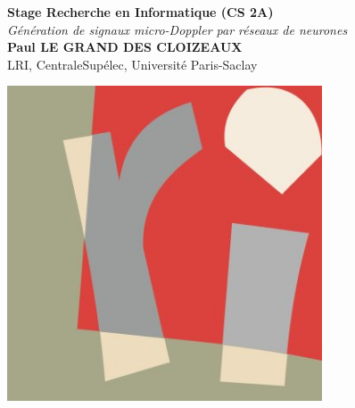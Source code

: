 \documentclass[a0,portrait]{a0poster}
\begin{document}
\large
\sffamily 


\begin{minipage}[b]{0.75\linewidth}
\veryHuge \color{NavyBlue} \textbf{Stage Recherche en Informatique (CS 2A)} \color{Black}\\
\Huge\textit{ Génération de signaux micro-Doppler par réseaux de neurones }\\[18mm]
\huge \textbf{Paul LE GRAND DES CLOIZEAUX}\\[0.0cm] 
\huge LRI, CentraleSupélec, Université Paris-Saclay
\end{minipage}
%
\begin{minipage}[b]{0.23\linewidth}
\begin{flushright}
\includegraphics[width=0.7\textwidth]{logo_lri.jpg}
\end{flushright}
\end{minipage}


\end{document}
